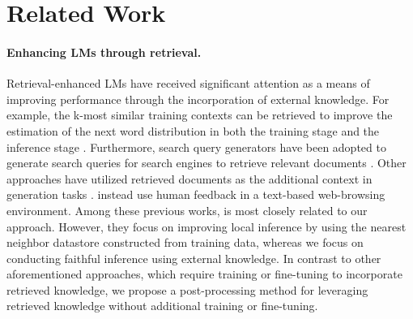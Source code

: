 \section{Related Work}

\paragraph{Enhancing LMs through retrieval.} Retrieval-enhanced LMs have received significant attention as a means of improving performance through the incorporation of external knowledge. For example, the k-most similar training contexts can be retrieved to improve the estimation of the next word distribution in both the training stage \cite{borgeaud2021improving} and the inference stage \cite{khandelwal2019generalization}. Furthermore, search query generators have been adopted to generate search queries for search engines to retrieve relevant documents \cite{komeili2022internet, shuster2022language, thoppilan2022lamda}. Other approaches have utilized retrieved documents as the additional context in generation tasks \cite{joshi2020contextualized, guu2020retrieval, lewis2020retrieval}. \citet{nakano2021webgpt} instead use human feedback in a text-based web-browsing environment. Among these previous works, \citet{khandelwal2019generalization} is most closely related to our approach. However, they focus on improving local inference by using the nearest neighbor datastore constructed from training data, whereas we focus on conducting faithful inference using external knowledge. In contrast to other aforementioned approaches, which require training or fine-tuning to incorporate retrieved knowledge, we propose a post-processing method for leveraging retrieved knowledge without additional training or fine-tuning.

